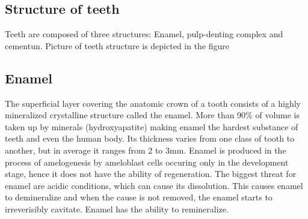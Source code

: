 \subsection{Structure of teeth}
Teeth are composed of three structures: Enamel, pulp-denting complex and cementun. Picture of teeth structure is depicted in the figure

\subsection*{Enamel}
The superficial layer covering the anatomic crown of a tooth consists of a highly mineralized crystalline structure called the enamel. More than 90\% of volume is taken up by minerals (hydroxyapatite) making enamel the hardest substance of teeth and even the human body. Its thickness varies from one class of tooth to another, but in average it ranges from 2 to 3mm. Enamel is produced in the process of amelogenesis by ameloblast cells occuring only in the development stage, hence it does not have the ability of regeneration. The biggest threat for enamel are acidic conditions, which can cause its dissolution. This causes enamel to demineralize and when the cause is not removed, the enamel starts to irreverisibly cavitate. Enamel has the ability to remineralize.

